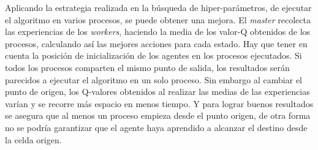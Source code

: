 		Aplicando la estrategia realizada en la búsqueda de hiper-parámetros, de ejecutar el algoritmo en varios procesos, se puede obtener una mejora. El \textit{master} recolecta las experiencias de los \textit{workers}, haciendo la media de los valor-Q obtenidos de los procesos, calculando así las mejores acciones para cada estado. Hay que tener en cuenta la posición de inicialización de los agentes en los procesos ejecutados. Si todos los procesos comparten el mismo punto de salida, los resultados serán parecidos a ejecutar el algoritmo en un solo proceso. Sin embargo al cambiar el punto de origen, los Q-valores obtenidos al realizar las medias de las experiencias varían y se recorre más espacio en menos tiempo. Y para lograr buenos resultados se asegura que al menos un proceso empieza desde el punto origen, de otra forma no se podría garantizar que el agente haya aprendido a alcanzar el destino desde la celda origen.			
			
			
	
	
	
	
